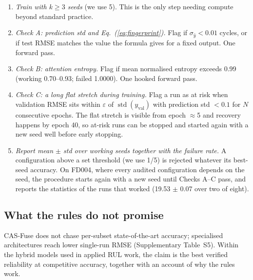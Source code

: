 \begin{enumerate}
  \item \emph{Train with $k\geq3$ seeds} (we use 5). This is the only step
        needing compute beyond standard practice.
  \item \emph{Check A: prediction std and Eq.~(\ref{eq:fingerprint}).}
        Flag if $\sigma_{\hat y}<0.01$ cycles, or if test RMSE matches the
        value the formula gives for a fixed output. One forward pass.
  \item \emph{Check B: attention entropy.} Flag if mean normalised entropy
        exceeds 0.99 (working 0.70--0.93; failed 1.0000). One hooked
        forward pass.
  \item \emph{Check C: a long flat stretch during training.} Flag a run as
        at risk when validation RMSE sits within $\varepsilon$ of
        $\operatorname{std}(y_{\mathrm{val}})$ with prediction std $<0.1$
        for $N$ consecutive epochs. The flat stretch is visible from epoch
        $\approx$5 and recovery happens by epoch 40, so at-risk runs can be
        stopped and started again with a new seed well before early stopping.
  \item \emph{Report mean $\pm$ std over working seeds together with the
        failure rate.} A configuration above a set threshold (we use 1/5) is
        rejected whatever its best-seed accuracy. On FD004, where every
        audited configuration depends on the seed, the procedure starts
        again with a new seed until Checks A--C pass, and reports the
        statistics of the runs that worked (19.53 $\pm$ 0.07 over two of
        eight).
\end{enumerate}

\subsection{What the rules do not promise}
\label{sec:method_tradeoff}

CAS-Fuse does not chase per-subset state-of-the-art accuracy; specialised
architectures reach lower single-run RMSE (Supplementary Table~S5). Within
the hybrid models used in applied RUL work, the claim is the best verified
reliability at competitive accuracy, together with an account of why the
rules work.
